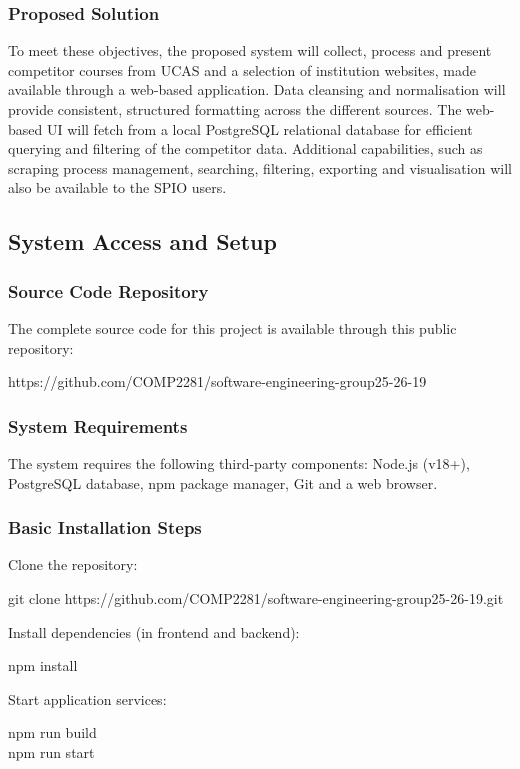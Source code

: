 \subsubsection{Proposed Solution}
To meet these objectives, the proposed system will collect, process and present competitor courses from UCAS and a selection of institution websites, made available through a web-based application. Data cleansing and normalisation will provide consistent, structured formatting across the different sources. The web-based UI will fetch from a local PostgreSQL relational database for efficient querying and filtering of the competitor data. Additional capabilities, such as scraping process management, searching, filtering, exporting and visualisation will also be available to the SPIO users.  


\subsection{System Access and Setup}

\subsubsection{Source Code Repository}
The complete source code for this project is available through this public repository:

\begin{commandbox}
https://github.com/COMP2281/software-engineering-group25-26-19
\end{commandbox}

\subsubsection{System Requirements}
The system requires the following third-party components: Node.js (v18+), PostgreSQL database, npm package manager, Git and a web browser. 

\subsubsection{Basic Installation Steps}
Clone the repository:

\begin{commandbox}
    git clone https://github.com/COMP2281/software-engineering-group25-26-19.git
\end{commandbox}
\noindent Install dependencies (in frontend and backend):
\begin{commandbox}
    npm install
\end{commandbox}
\noindent Start application services:
\begin{commandbox}[/backend]
    npm run build \\
    npm run start
\end{commandbox}

